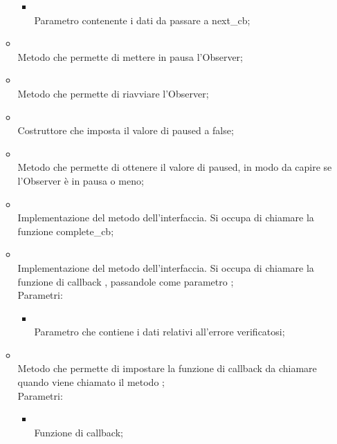 \begin{itemize}
\begin{itemize}
\begin{itemize}
			\item {} \\
			Parametro contenente i dati da passare a next\_cb;
		\end{itemize}
		\item[]  \\
		Metodo che permette di mettere in pausa l'Observer;\\
		\item[]  \\
		Metodo che permette di riavviare l'Observer;\\
		\item[]  \\
		Costruttore che imposta il valore di paused a false;\\
		\item[]  \\
		Metodo che permette di ottenere il valore di paused, in modo da capire se l'Observer è in pausa o meno;\\
		\item[]  \\
		Implementazione del metodo dell'interfaccia. Si occupa di chiamare la funzione complete_cb;\\
		\item[]  \\
		Implementazione del metodo dell'interfaccia. Si occupa di chiamare la funzione di callback , passandole come parametro ;\\
		Parametri:
		\begin{itemize}
			\item {} \\
			Parametro che contiene i dati relativi all'errore verificatosi;
		\end{itemize}
		\item[]  \\
		Metodo che permette di impostare la funzione di callback da chiamare quando viene chiamato il metodo ;\\
		Parametri:
		\begin{itemize}
			\item {} \\
			Funzione di callback;
		\end{itemize}

\end{itemize}
\end{itemize}
